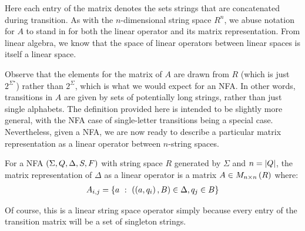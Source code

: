Here each entry of the matrix denotes the sets strings that are
concatenated during transition.
As with the \(n\)-dimensional string space \(R^n\),
we abuse notation for \(A\) to stand in for
both the linear operator and its matrix representation.
From linear algebra, we know that the space of linear operators between
linear spaces is itself a linear space.

Observe that the elements for the matrix of \(A\) are drawn from
\(R\) (which is just \(2^{\Sigma^\star}\))
rather than \(2^{\Sigma}\),
which is what we would expect for an NFA.
In other words, transitions in \(A\) are given by sets of potentially
long strings, rather than just single alphabets.
The definition provided here is intended to be slightly more general,
with the NFA case of single-letter transitions being a special case.
Nevertheless,
given a NFA, we are now ready to describe a particular matrix representation
as a linear operator between \(n\)-string spaces.

\begin{definition}
  For a NFA \(\left(\Sigma, Q, \Delta, S, F\right)\) with
  string space \(R\) generated by \(\Sigma\) and \(n = \left\lvert Q\right\rvert\),
  the matrix representation of \(\Delta\) as a linear operator
  is a matrix
  \(A \in M_{n \times n} \left(R\right)\)  where:
  \begin{align*}
    A_{i, j}
      = \left\{a \  : \  \left(\left(a, q_i\right), B\right) \in \Delta, q_j \in B\right\}
  \end{align*}
\end{definition}

Of course, this is a linear string space operator simply because
every entry of the transition matrix will be a set of singleton strings.




